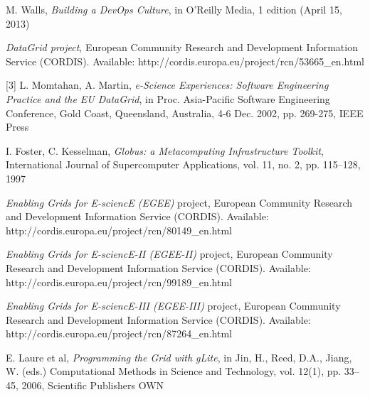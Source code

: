 \documentclass[journal]{IEEEtran}
\begin{document}
%
%
%
\begin{thebibliography}{1}

M. Walls, \emph{Building a DevOps Culture}, in O'Reilly Media, 1 edition (April 15, 2013)

\emph{DataGrid project}, European Community Research and Development Information Service (CORDIS). Available: http://cordis.europa.eu/project/rcn/53665\_en.html

[3] L. Momtahan, A. Martin, \emph{e-Science Experiences: Software Engineering Practice and the EU DataGrid}, in Proc. Asia-Pacific Software Engineering Conference, Gold Coast, Queensland, Australia, 4-6 Dec. 2002, pp. 269-275, IEEE Press

I. Foster, C. Kesselman, \emph{Globus: a Metacomputing Infrastructure Toolkit}, International Journal of Supercomputer Applications, vol. 11, no. 2, pp. 115–128, 1997

\emph{Enabling Grids for E-sciencE (EGEE)} project, European Community Research and Development Information Service (CORDIS). Available: http://cordis.europa.eu/project/rcn/80149\_en.html

\emph{Enabling Grids for E-sciencE-II (EGEE-II)} project, European Community Research and Development Information Service (CORDIS). Available: http://cordis.europa.eu/project/rcn/99189\_en.html

\emph{Enabling Grids for E-sciencE-III (EGEE-III)} project, European Community Research and Development Information Service (CORDIS). Available: http://cordis.europa.eu/project/rcn/87264\_en.html

E. Laure et al, \emph{Programming the Grid with gLite}, in Jin, H., Reed, D.A., Jiang, W. (eds.) Computational Methods in Science and Technology, vol. 12(1), pp. 33–45, 2006, Scientific Publishers OWN


\end{thebibliography}
\end{document}
